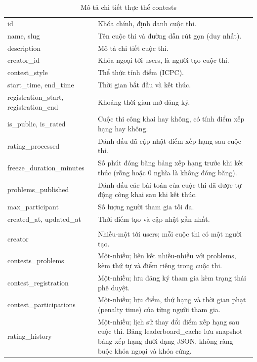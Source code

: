 \documentclass[12pt, a4paper]{report}
\begin{document}
\begin{longtable}{|>{\raggedright\arraybackslash}p{3.6cm}|>{\raggedright\arraybackslash}p{8.3cm}|}
  \caption{Mô tả chi tiết thực thể contests}\label{tab:erd-contests} \\
  \hline
  \endfirsthead
  \hline
  \endhead
  \hline
  \endfoot
  \endlastfoot
  \multicolumn{2}{|l|}{\textbf{Thuộc tính}} \\
  \hline
  id & Khóa chính, định danh cuộc thi. \\
  \hline
  name, slug & Tên cuộc thi và đường dẫn rút gọn (duy nhất). \\
  \hline
  description & Mô tả chi tiết cuộc thi. \\
  \hline
  creator\_id & Khóa ngoại tới users, là người tạo cuộc thi. \\
  \hline
  contest\_style & Thể thức tính điểm (\ac{ICPC}). \\
  \hline
  start\_time, end\_time & Thời gian bắt đầu và kết thúc. \\
  \hline
  registration\_start, registration\_end & Khoảng thời gian mở đăng ký. \\
  \hline
  is\_public, is\_rated & Cuộc thi công khai hay không, có tính điểm xếp
    hạng hay không. \\
  \hline
  rating\_processed & Đánh dấu đã cập nhật điểm xếp hạng sau cuộc thi. \\
  \hline
  freeze\_duration\_minutes & Số phút đóng băng bảng xếp hạng trước khi kết thúc
    (rỗng hoặc 0 nghĩa là không đóng băng). \\
  \hline
  problems\_published & Đánh dấu các bài toán của cuộc thi đã được tự động công khai
    sau khi kết thúc. \\
  \hline
  max\_participant & Số lượng người tham gia tối đa. \\
  \hline
  created\_at, updated\_at & Thời điểm tạo và cập nhật gần nhất. \\
  \hline
  \multicolumn{2}{|l|}{\textbf{Quan hệ}} \\
  \hline
  creator & Nhiều-một tới users; mỗi cuộc thi có một người tạo. \\
  \hline
  contests\_problems & Một-nhiều; liên kết nhiều-nhiều với problems,
    kèm thứ tự và điểm riêng trong cuộc thi. \\
  \hline
  contest\_registration & Một-nhiều; lưu đăng ký tham gia kèm trạng thái phê
    duyệt. \\
  \hline
  contest\_participations & Một-nhiều; lưu điểm, thứ hạng và thời gian phạt (penalty time) của
    từng người tham gia. \\
  \hline
  rating\_history & Một-nhiều; lịch sử thay đổi điểm xếp hạng sau cuộc thi. Bảng
    leaderboard\_cache lưu snapshot bảng xếp hạng dưới dạng JSON, không ràng buộc
    khóa ngoại và khóa cứng. \\
  \hline
\end{longtable}
\end{document}
